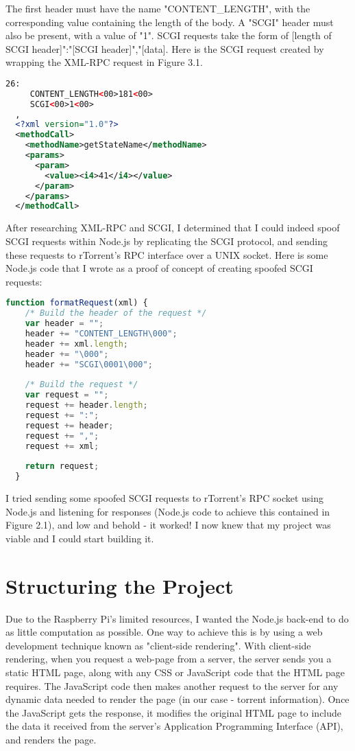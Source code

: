 The first header must have the name "CONTENT\_LENGTH", with the corresponding value containing the length of the body. A "SCGI" header must also be present, with a value of "1". SCGI requests take the form of [length of SCGI header]":"[SCGI header]","[data]. Here is the SCGI request created by wrapping the XML-RPC request in Figure 3.1. 

\vspace{20px}
\begin{lstlisting}[caption=Layout of a SCGI request, language=XML]
  26:
     CONTENT_LENGTH<00>181<00>
     SCGI<00>1<00>
  ,
  <?xml version="1.0"?>
  <methodCall>
    <methodName>getStateName</methodName>
    <params>
      <param>
        <value><i4>41</i4></value>
      </param>
    </params>
  </methodCall>
\end{lstlisting}


After researching XML-RPC and SCGI, I determined that I could indeed spoof SCGI requests within Node.js by replicating the SCGI protocol, and sending these requests to rTorrent's RPC interface over a UNIX socket. Here is some Node.js code that I wrote as a proof of concept of creating spoofed SCGI requests:

\vspace{20px}
\begin{lstlisting}[caption=Layout of a SCGI request, language=JavaScript]
  function formatRequest(xml) {  
    /* Build the header of the request */
    var header = "";
    header += "CONTENT_LENGTH\000";
    header += xml.length;
    header += "\000";
    header += "SCGI\0001\000";
  
    /* Build the request */
    var request = "";
    request += header.length;
    request += ":";
    request += header;
    request += ",";
    request += xml;
  
    return request;
  }
\end{lstlisting}

I tried sending some spoofed SCGI requests to rTorrent's RPC socket using Node.js and listening for responses (Node.js code to achieve this contained in Figure 2.1), and low and behold - it worked! I now knew that my project was viable and I could start building it.


\section{Structuring the Project}
Due to the Raspberry Pi's limited resources, I wanted the Node.js back-end to do as little computation as possible. One way to achieve this is by using a web development technique known as "client-side rendering". With client-side rendering, when you request a web-page from a server, the server sends you a static HTML page, along with any CSS or JavaScript code that the HTML page requires. The JavaScript code then makes another request to the server for any dynamic data needed to render the page (in our case - torrent information). Once the JavaScript gets the response, it modifies the original HTML page to include the data it received from the server's Application Programming Interface (API), and renders the page.

